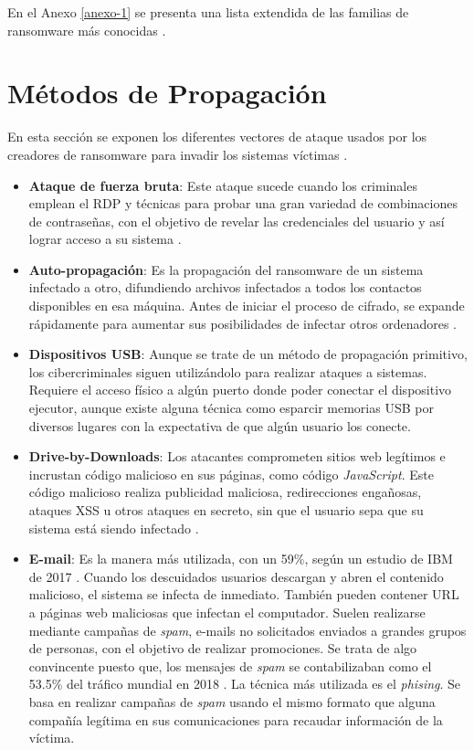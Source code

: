 En el Anexo \ref{anexo-1} se presenta una lista extendida de las familias de ransomware más conocidas \cite{7}. 

\section{Métodos de Propagación}\label{sec:2-6}
\noindent En esta sección se exponen los diferentes vectores de ataque usados por los creadores de ransomware para invadir los sistemas víctimas \cite{ransommasive}.


\begin{itemize}
    \item \textbf{Ataque de fuerza bruta}: Este ataque sucede cuando los criminales emplean el \gls{RDP} y técnicas para probar una gran variedad de combinaciones de contraseñas, con el objetivo de revelar las credenciales del usuario y así lograr acceso a su sistema \cite{78}.  
    
    \item \textbf{Auto-propagación}: Es la propagación del ransomware de un sistema infectado a otro, difundiendo archivos infectados a todos los contactos disponibles en esa máquina. Antes de iniciar el proceso de cifrado, se expande rápidamente para aumentar sus posibilidades de infectar otros ordenadores \cite{29}.

    \item \textbf{Dispositivos \gls{USB}}: Aunque se trate de un método de propagación primitivo, los cibercriminales siguen utilizándolo para realizar ataques a sistemas. Requiere el acceso físico a algún puerto donde poder conectar el dispositivo ejecutor, aunque existe alguna técnica como esparcir memorias \gls{USB} por diversos lugares con la expectativa de que algún usuario los conecte.
    
    \item \textbf{Drive-by-Downloads}: Los atacantes comprometen sitios web legítimos e incrustan código malicioso en sus páginas, como código \textit{JavaScript}. Este código malicioso realiza publicidad maliciosa, redirecciones engañosas, ataques \gls{XSS} u otros ataques en secreto, sin que el usuario sepa que su sistema está siendo infectado \cite{46} \cite{47}.

    \item \textbf{E-mail}: Es la manera más utilizada, con un 59\%, según un estudio de IBM de 2017 \cite{IBMstats}. Cuando los descuidados usuarios descargan y abren el contenido malicioso, el sistema se infecta de inmediato. También pueden contener \gls{URL} a páginas web maliciosas que infectan el computador. Suelen realizarse mediante campañas de \textit{spam}, e-mails no solicitados enviados a grandes grupos de personas, con el objetivo de realizar promociones. Se trata de algo convincente puesto que, los mensajes de \textit{spam} se contabilizaban como el 53.5\% del tráfico mundial en 2018 \cite{statista}. La técnica más utilizada es el \textit{phising}. Se basa en realizar campañas de \textit{spam} usando el mismo formato que alguna compañía legítima en sus comunicaciones para recaudar información de la víctima. 


\end{itemize}
